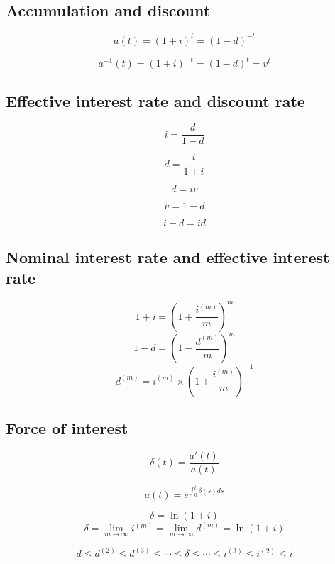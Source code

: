 \documentclass[
]{book}
\begin{document}
\hypertarget{accumulation-and-discount}{%
\subsection*{Accumulation and discount}\label{accumulation-and-discount}}

\[a(t)=(1+i)^t=(1-d)^{-t}\]

\[a^{-1}(t)=(1+i)^{-t}=(1-d)^t=v^t\]

\hypertarget{effective-interest-rate-and-discount-rate}{%
\subsection*{Effective interest rate and discount rate}\label{effective-interest-rate-and-discount-rate}}

\[i=\frac{d}{1-d}\]

\[d=\frac{i}{1+i}\]

\[d=iv\]

\[v=1-d\]

\[i-d=id\]

\hypertarget{nominal-interest-rate-and-effective-interest-rate}{%
\subsection*{Nominal interest rate and effective interest rate}\label{nominal-interest-rate-and-effective-interest-rate}}

\[1+i=\left(1+\frac{i^{(m)}}{m}\right)^m\]
\[1-d=\left(1-\frac{d^{(m)}}{m}\right)^m\]
\[d^{(m)}=i^{(m)}\times\left(1+\frac{i^{(m)}}{m}\right)^{-1}\]

\hypertarget{force-of-interest}{%
\subsection*{Force of interest}\label{force-of-interest}}

\[\delta(t)=\frac{a'(t)}{a(t)}\]

\[a(t)=e^{\int_0^t\delta(s)ds}\]

\[\delta=\ln(1+i)\]
\[\delta=\lim_{m\rightarrow\infty} i^{(m)}=\lim_{m\rightarrow\infty} d^{(m)}=\ln(1+i)\]

\[d\le d^{(2)}\le d^{(3)}\le\cdots\le \delta\le\cdots\le i^{(3)}\le i^{(2)}\le i\]
\end{document}

